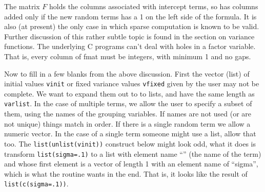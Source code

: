 \documentclass{article}
\begin{document}
The matrix $F$ holds the columns associated with intercept terms,
so has columns added only if the new random terms has a 1 on the
left side of the formula.
It is also (at present) the only case in which sparse computation is
known to be valid. 
Further discussion of this rather subtle topic is found in the section
on variance functions.
The underlying C programs can't deal with holes in a factor variable. %
That is, every column of fmat must be integers, with minimum 1 and no
gaps.  

Now to fill in a few blanks from the above discussion.
First the vector (list) of initial values \Verb!vinit! or fixed variance
values \Verb!vfixed! given by the user may not be complete.
We want to expand them out to to lists, and have the same length as 
\Verb!varlist!.
In the case of multiple terms, we allow the user to specify a subset of
them, using the names of the grouping variables.  If names are
not used (or are not unique) things match in order.
If there is a single random term we allow a numeric vector.
In the case of a single term someone might use a list, allow that too.
The \Verb!list(unlist(vinit))! construct below might look odd, 
what it does is transform
\Verb!list(sigma=.1)! to a list with element name ``'' (the name of the
term) and whose first element is a vector of length 1 with an element name
of ``sigma'', which is what the routine wants in the end.
That is, it looks like the result of \Verb!list(c(sigma=.1))!.
\end{document}
